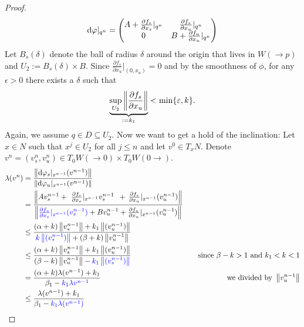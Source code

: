 \begin{proof}
		\begin{align*}
			\mathop{}\!\mathrm{d} \varphi|_{q^n}=\begin{pmatrix}
				A+ \frac{\partial f_s}{\partial x_s}|_{q^n}&    \frac{\partial f_s}{\partial x_u}|_{q^n}\\
				0                                   & B+ \frac{\partial f_u}{\partial x_u}|_{q^n}
			\end{pmatrix} 
		\end{align*}
		Let $B_s(\delta)$ denote the ball of radius $\delta$ around the origin that lives in $W(\to p)$ and $U_2:= B_s(\delta)\times B$. Since $\frac{\partial f_s}{\partial x_u}|_{(0,x_u)}=0$ and by the smoothness of  $\phi$, for any $\epsilon >0$ there exists a $\delta$ such that 
		\begin{align*}
			\underbrace{\sup_{U_2}\left\lVert\frac{\partial f_s}{\partial x_u}\right\rVert}_{:=k_1}< \min\{\varepsilon, k \}.
		\end{align*} 
 Again, we assume $q\in D\subseteq  U_2$. Now we want to get a hold of the inclination:  Let $x\in N$ such that $x^j\in U_2 $ for all $j\leq n$ and let $v^0\in T_xN$. Denote $v^n=(v^n_s,v^n_u)\in T_0W(\to 0)\times T_0W(0 \to)$. 
		\begin{align}
			\lambda(v^n)&= \frac{\left\lVert\mathop{}\!\mathrm{d} \varphi_s|_{x^{n-1}}(v^{n-1})\right\rVert}{\left\lVert\mathop{}\!\mathrm{d} \varphi_u|_{x^{n-1}}(v^{n-1})\right\rVert} \nonumber \\
			&=\frac{\left\lVert Av_s^{n-1} +\ \frac{\partial f_s}{\partial x_s}|_{x^{n-1}}v_s^{n-1} \ \, + \, \frac{\partial f_s}{\partial x_u}|_{x^{n-1}}(v_u^{n-1})\right\rVert}{\left\lVert\color{blue} \frac{\partial f_u}{\partial x_s}|_{x^{n-1}}(v_s^{n-1}) \color{black}+   Bv_u^{n-1}+\frac{\partial f_u}{\partial x_u}|_{x^{n-1}}(v_u^{n-1})\right\rVert} \nonumber \\
			& \leq \frac{ (\alpha +k )\left\lVert v_s^{n-1}\right\rVert+k_1 \left\lVert(v_u^{n-1})\right\rVert}
			{ \color{blue}k \left\lVert(v_s^{n-1})\right\rVert \color{black}  +  (\beta+k)\left\lVert v_u^{n-1}\right\rVert} \nonumber \\
			& \leq \frac{ (\alpha +k )\left\lVert v_s^{n-1}\right\rVert+k_1 \left\lVert(v_u^{n-1})\right\rVert}
			{ (\beta-k)\left\lVert v_u^{n-1}\right\rVert  - \color{blue} k_1 \left\lVert(v_s^{n-1})\right\rVert \color{black} } &\quad \text{since } \beta-k>1 \text{ and }k_1<k<1 \nonumber \\
			& = \frac{ (\alpha +k )\lambda(v^{n-1})+k_1}
			{ \beta_1  - \color{blue} k_1 \lambda{v^{n-1}\color{black} }} &\quad \text{we divided by }\left\lVert v_u^{n-1}\right\rVert \nonumber \\
			&\leq \frac{\lambda(v^{n-1})+k_1}
			{ \beta_1  - \color{blue} k_1 \lambda(v^{n-1}) \color{black} }  \label{eq: estimate lambda(v^n)}				
		\end{align} 

\end{proof}
